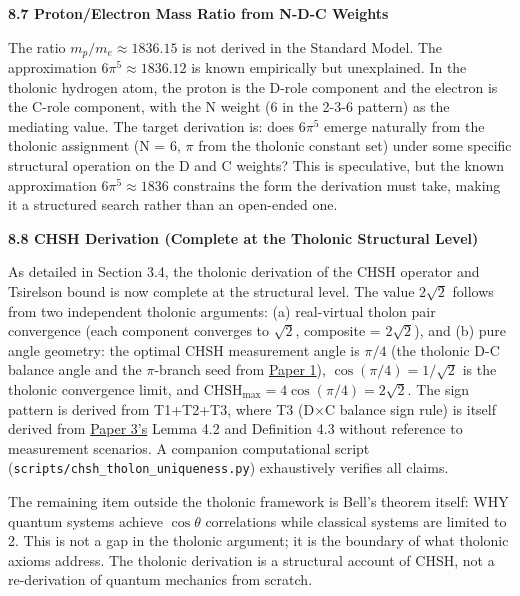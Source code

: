 \documentclass[12pt]{article}
\begin{document}
\textbf{8.7 Proton/Electron Mass Ratio from N-D-C Weights}

The ratio \(m_p/m_e \approx 1836.15\) is not derived in the Standard
Model. The approximation \(6\pi^5 \approx 1836.12\) is known empirically
but unexplained. In the tholonic hydrogen atom, the proton is the D-role
component and the electron is the C-role component, with the N weight (6
in the 2-3-6 pattern) as the mediating value. The target derivation is:
does \(6\pi^5\) emerge naturally from the tholonic assignment (N = 6,
\(\pi\) from the tholonic constant set) under some specific structural
operation on the D and C weights? This is speculative, but the known
approximation \(6\pi^5 \approx 1836\) constrains the form the derivation
must take, making it a structured search rather than an open-ended one.

\textbf{8.8 CHSH Derivation (Complete at the Tholonic Structural Level)}

As detailed in Section 3.4, the tholonic derivation of the CHSH operator
and Tsirelson bound is now complete at the structural level. The value
\(2\sqrt{2}\) follows from two independent tholonic arguments: (a)
real-virtual tholon pair convergence (each component converges to
\(\sqrt{2}\), composite = \(2\sqrt{2}\)), and (b) pure angle geometry:
the optimal CHSH measurement angle is \(\pi/4\) (the tholonic D-C
balance angle and the \(\pi\)-branch seed from
\href{https://github.com/baardev/truevalue/blob/main/docnav/Research/papers/1_recursive-tholonic-five-constants/1_recursive-tholonic-five-constants.pdf}{Paper
1}), \(\cos(\pi/4) = 1/\sqrt{2}\) is the tholonic convergence limit, and
\(\mathrm{CHSH}_{\max} = 4\cos(\pi/4) = 2\sqrt{2}\). The sign pattern is
derived from T1+T2+T3, where T3 (D\(\times\)C balance sign rule) is
itself derived from
\href{https://github.com/baardev/truevalue/blob/main/docnav/Research/papers/3_minimal-recursive-triadic-framework/3_minimal-recursive-triadic-framework.pdf}{Paper
3's} Lemma 4.2 and Definition 4.3 without reference to measurement
scenarios. A companion computational script
(\texttt{scripts/chsh\_tholon\_uniqueness.py}) exhaustively verifies all
claims.

The remaining item outside the tholonic framework is Bell's theorem
itself: WHY quantum systems achieve \(\cos\theta\) correlations while
classical systems are limited to 2. This is not a gap in the tholonic
argument; it is the boundary of what tholonic axioms address. The
tholonic derivation is a structural account of CHSH, not a re-derivation
of quantum mechanics from scratch.
\end{document}
